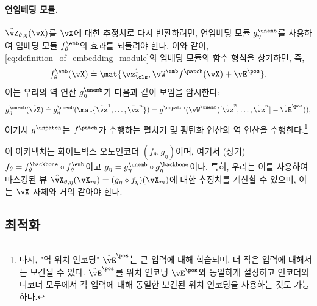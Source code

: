 \documentclass[../../book-main_ko.tex]{subfiles}
\begin{document}
\paragraph{언임베딩 모듈.} \(\tilde{\vZ}_{\theta, \eta}(\vX)\)를 \(\vX\)에 대한 추정치로 다시 변환하려면, 언임베딩 모듈 \(g_{\eta}^{\unemb}\)를 사용하여 임베딩 모듈 \(f_{\theta}^{\emb}\)의 효과를 되돌려야 한다. 이와 같이, \eqref{eq:definition_of_embedding_module}의 임베딩 모듈의 함수 형식을 상기하면, 즉,
\begin{equation}
    f_{\theta}^{\emb}(\vX) \doteq \mat{\vz_{\cls}^{1}, \vW^{\emb}f^{\patch}(\vX) + \vE^{\pos}}.
\end{equation}
이는 우리의 역 연산 \(g_{\eta}^{\unemb}\)가 다음과 같이 보임을 암시한다:
\begin{equation}
    g_{\eta}^{\unemb}(\tilde{\vZ}) \doteq g_{\eta}^{\unemb}(\mat{\tilde{\vz}^{1}, \dots, \tilde{\vz}^{n}}) = g^{\unpatch}(\vW^{\unemb}( [\tilde{\vz}^{2}, \dots, \tilde{\vz}^{n}] - \tilde{\vE}^{\pos})),
\end{equation}
여기서 \(g^{\unpatch}\)는 \(f^{\patch}\)가 수행하는 펼치기 및 평탄화 연산의 역 연산을 수행한다.\footnote{다시, "역 위치 인코딩" \(\tilde{\vE}^{\pos}\)는 큰 입력에 대해 학습되며, 더 작은 입력에 대해서는 보간될 수 있다. \(\tilde{\vE}^{\pos}\)를 위치 인코딩 \(\vE^{\pos}\)와 동일하게 설정하고 인코더와 디코더 모두에서 각 입력에 대해 동일한 보간된 위치 인코딩을 사용하는 것도 가능하다.}

이 아키텍처는 화이트박스 오토인코더 \((f_{\theta}, g_{\eta})\)이며, 여기서 (상기) \(f_{\theta} = f_{\theta}^{\backbone} \circ f_{\theta}^{\emb}\)이고 \(g_{\eta} = g_{\eta}^{\unemb} \circ g_{\eta}^{\backbone}\)이다. 특히, 우리는 이를 사용하여 마스킹된 뷰 \(\hat{\vX}_{\theta, \eta}(\vX_{m}) = (g_{\eta} \circ f_{\eta})(\vX_{m})\)에 대한 추정치를 계산할 수 있으며, 이는 \(\vX\) 자체와 거의 같아야 한다.

\subsection{최적화}\label{sub:image_completion_optimization}
\end{document}
